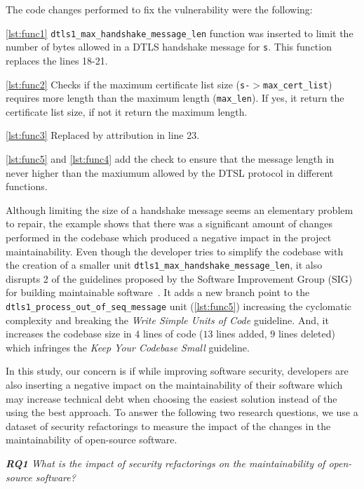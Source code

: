 \documentclass[10pt,conference]{IEEEtran}
\begin{document}
The code changes performed to fix the vulnerability were the following:

\ref{lst:func1} \texttt{dtls1\_max\_handshake\_message\_len} function was inserted to limit the number of bytes allowed in a DTLS handshake message for \texttt{s}. This function replaces the lines 18-21.

\ref{lst:func2} Checks if the maximum certificate list size (\texttt{s-$>$max\_cert\_list}) requires more length than the maximum length (\texttt{max\_len}). If yes, it return the certificate list size, if not it return the maximum length.

\ref{lst:func3} Replaced by attribution in line 23.

\ref{lst:func5} and \ref{lst:func4} add the check to ensure that the message length in never higher than the maxiumum allowed by the DTSL protocol in different functions.

Although limiting the size of a handshake message seems an elementary problem to repair, the example shows that there was a significant amount of changes performed in the codebase which produced a negative impact in the project maintainability. Even though the developer tries to simplify the codebase with the creation of a smaller unit \texttt{dtls1\_max\_handshake\_message\_len}, it also disrupts 2 of the guidelines proposed by the Software Improvement Group (SIG) for building maintainable software~\cite{Visser:2016:OREILLY}. It adds a new branch point to the \texttt{dtls1\_process\_out\_of\_seq\_message} unit (\ref{lst:func5}) increasing the cyclomatic complexity and breaking the \emph{Write Simple Units of Code} guideline. And, it increases the codebase size in $4$ lines of code ($13$ lines added, $9$ lines deleted) which infringes the \emph{Keep Your Codebase Small} guideline. 

In this study, our concern is if while improving software security, developers are also inserting a negative impact on the maintainability of their software which may increase technical debt when choosing the easiest solution instead of the using the best approach. To answer the following two research questions, we use a dataset of security refactorings to measure the impact of the changes in the maintainability of open-source software.


\begin{framed}
\textit{\textbf{RQ1} What is the impact of security refactorings on the maintainability of open-source software?}
\end{framed}
\end{document}
